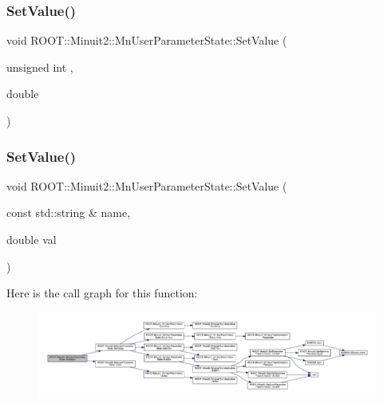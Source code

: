 \subsubsection{\texorpdfstring{SetValue()}{SetValue()}\hspace{0.1cm}{\footnotesize\ttfamily [2/4]}}
{\footnotesize\ttfamily void R\+O\+O\+T\+::\+Minuit2\+::\+Mn\+User\+Parameter\+State\+::\+Set\+Value (\begin{DoxyParamCaption}\item[{unsigned int}]{,  }\item[{double}]{ }\end{DoxyParamCaption})}

\mbox{\label{classROOT_1_1Minuit2_1_1MnUserParameterState_abc93cf38ae05fdbb8472c1b5d589e947}} 
\subsubsection{\texorpdfstring{SetValue()}{SetValue()}\hspace{0.1cm}{\footnotesize\ttfamily [3/4]}}
{\footnotesize\ttfamily void R\+O\+O\+T\+::\+Minuit2\+::\+Mn\+User\+Parameter\+State\+::\+Set\+Value (\begin{DoxyParamCaption}\item[{const std\+::string \&}]{name,  }\item[{double}]{val }\end{DoxyParamCaption})}

Here is the call graph for this function\+:\nopagebreak
\begin{figure}[H]
\begin{center}
\leavevmode
\includegraphics[width=350pt]{d3/de0/classROOT_1_1Minuit2_1_1MnUserParameterState_abc93cf38ae05fdbb8472c1b5d589e947_cgraph}
\end{center}
\end{figure}
\mbox{\label{classROOT_1_1Minuit2_1_1MnUserParameterState_abc93cf38ae05fdbb8472c1b5d589e947}} 
